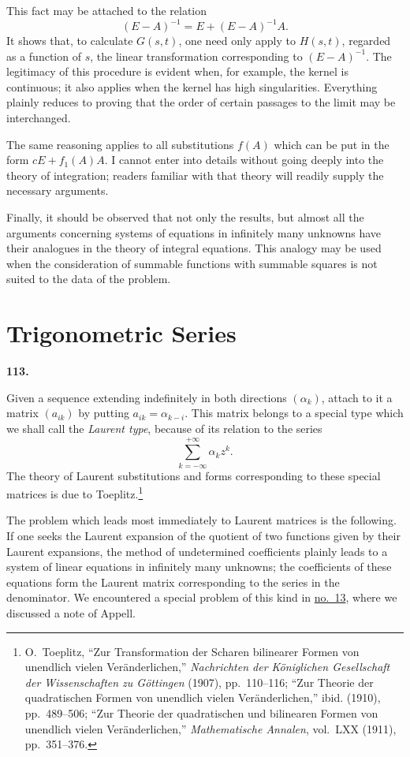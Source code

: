 \documentclass[
  paper=b5,
  fontsize=13pt,
  twoside=true,
  open=any,
  bookmarkpackage=false,
  chapterprefix=true,
  headings=normal
]{scrbook}
\theoremstyle{definition}
\newcommand{\numberedparagraph}[1]{%
  \par\medskip\phantomsection\label{sec:#1}%
  \noindent\textbf{#1.}\enspace
}
\begin{document}
This fact may be attached to the relation
\[
  (E-A)^{-1}=E+(E-A)^{-1}A.
\]
It shows that, to calculate \(G(s,t)\), one need only apply to \(H(s,t)\),
regarded as a function of \(s\), the linear transformation corresponding to
\((E-A)^{-1}\).  The legitimacy of this procedure is evident when, for
example,
the kernel is continuous; it also applies when the kernel has high
singularities.  Everything plainly reduces to proving that the order of
certain passages to the limit may be interchanged.

The same reasoning applies to all substitutions \(f(A)\) which can be put in
the form \(cE+f_1(A)A\).  I cannot enter into details without going deeply into
the theory of integration; readers familiar with that theory will readily
supply the necessary arguments.

Finally, it should be observed that not only the results, but almost all the
arguments concerning systems of equations in infinitely many unknowns have
their analogues in the theory of integral equations.  This analogy may be used
when the consideration of summable functions with summable squares is not
suited to the data of the problem.

\section{Trigonometric Series}

\numberedparagraph{113}
Given a sequence extending indefinitely in both directions \((\alpha_k)\), attach
to it a matrix \((a_{ik})\) by putting \(a_{ik}=\alpha_{k-i}\).  This matrix belongs
to a special type which we shall call the \emph{Laurent type}, because of its
relation to the series
\[
  \sum_{k=-\infty}^{+\infty}\alpha_kz^k.
\]
The theory of Laurent substitutions and forms corresponding to these special
matrices is due to Toeplitz.\footnote{O.~Toeplitz, ``Zur Transformation der
Scharen bilinearer Formen von unendlich vielen Veränderlichen,''
\emph{Nachrichten der Königlichen Gesellschaft der Wissenschaften zu
Göttingen} (1907), pp.~110--116; ``Zur Theorie der quadratischen Formen von
unendlich vielen Veränderlichen,'' ibid. (1910), pp.~489--506; ``Zur Theorie
der quadratischen und bilinearen Formen von unendlich vielen
Veränderlichen,'' \emph{Mathematische Annalen}, vol.~LXX (1911),
pp.~351--376.}

The problem which leads most immediately to Laurent matrices is the following.
If one seeks the Laurent expansion of the quotient of two functions given by
their Laurent expansions, the method of undetermined coefficients
plainly leads to a system of linear equations in infinitely many unknowns;
the coefficients of these equations form the Laurent matrix corresponding to
the series in the denominator.  We encountered a special problem of this kind
in \hyperref[sec:13]{no.~13}, where we discussed a note of Appell.
\end{document}
